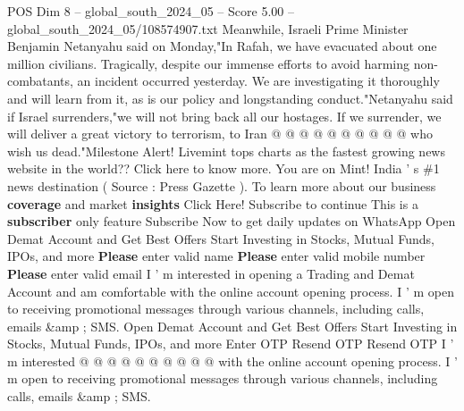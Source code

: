 \begin{textsample}{POS Dim 8 – global\_south\_2024\_05 – Score 5.00 – global\_south\_2024\_05/108574907.txt}
Meanwhile, Israeli Prime Minister Benjamin Netanyahu said on Monday,"In Rafah, we have evacuated about one million civilians.
Tragically, despite our immense efforts to avoid harming non-combatants, an incident occurred yesterday.
We are investigating it thoroughly and will learn from it, as is our policy and longstanding conduct."Netanyahu said if Israel surrenders,"we will not bring back all our hostages.
If we surrender, we will deliver a great victory to terrorism, to Iran @ @ @ @ @ @ @ @ @ @ who wish us dead."Milestone Alert!
Livemint tops charts as the fastest growing news website in the world??
Click here to know more.
You are on Mint!
India ' s \#1 news destination ( Source : Press Gazette ).
To learn more about our business \textbf{coverage} and market \textbf{insights} Click Here!
Subscribe to continue This is a \textbf{subscriber} only feature Subscribe Now to get daily updates on WhatsApp Open Demat Account and Get Best Offers Start Investing in Stocks, Mutual Funds, IPOs, and more \textbf{Please} enter valid name \textbf{Please} enter valid mobile number \textbf{Please} enter valid email I ' m interested in opening a Trading and Demat Account and am comfortable with the online account opening process.
I ' m open to receiving promotional messages through various channels, including calls, emails \&amp ; SMS.
Open Demat Account and Get Best Offers Start Investing in Stocks, Mutual Funds, IPOs, and more Enter OTP Resend OTP Resend OTP I ' m interested @ @ @ @ @ @ @ @ @ @ with the online account opening process.
I ' m open to receiving promotional messages through various channels, including calls, emails \&amp ; SMS.

\end{textsample}
